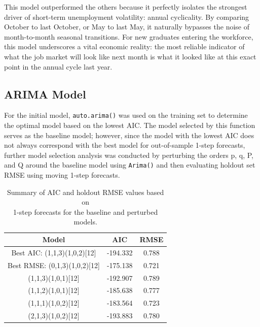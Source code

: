 \documentclass[]{article}
\begin{document}
This model outperformed the others because it perfectly isolates the strongest driver of short-term unemployment volatility: annual cyclicality. By comparing October to last October, or May to last May, it naturally bypasses the noise of month-to-month seasonal transitions. For new graduates entering the workforce, this model underscores a vital economic reality: the most reliable indicator of what the job market will look like next month is what it looked like at this exact point in the annual cycle last year.


\subsection{ARIMA Model}

For the initial model, \texttt{auto.arima()} was used on the training set to determine the optimal model based on the lowest AIC. The model selected by this function serves as the baseline model; however, since the model with the lowest AIC does not always correspond with the best model for out-of-sample 1-step forecasts, further model selection analysis was conducted by perturbing the orders p, q, P, and Q around the baseline model using \texttt{Arima()} and then evaluating holdout set RMSE using moving 1-step forecasts.

\begin{table}[H]
    \centering
    \captionsetup{justification=centering,margin=2cm}
    \begin{tabular}{|c|c|c|}
    \hline
        Model & AIC & RMSE\\
    \hline\hline
        Best AIC: (1,1,3)(1,0,2)[12] & 
        -194.332 & 0.788\\
        Best RMSE: (0,1,3)(1,0,2)[12] & -175.138 & 0.721\\
        \hline
       	(1,1,3)(1,0,1){[}12{]} & -192.907 & 0.789 \\
       	(1,1,2)(1,0,1){[}12{]} & -185.638 & 0.777 \\
       	(1,1,1)(1,0,2){[}12{]} & -183.564 & 0.723 \\
       	(2,1,3)(1,0,2){[}12{]} & -193.883 & 0.780 \\
    \hline
    
    
    \hline
    \end{tabular}
    \caption{Summary of AIC and holdout RMSE values based on\\ 1-step forecasts for the baseline and perturbed models.
    }
\end{table}
\end{document}

